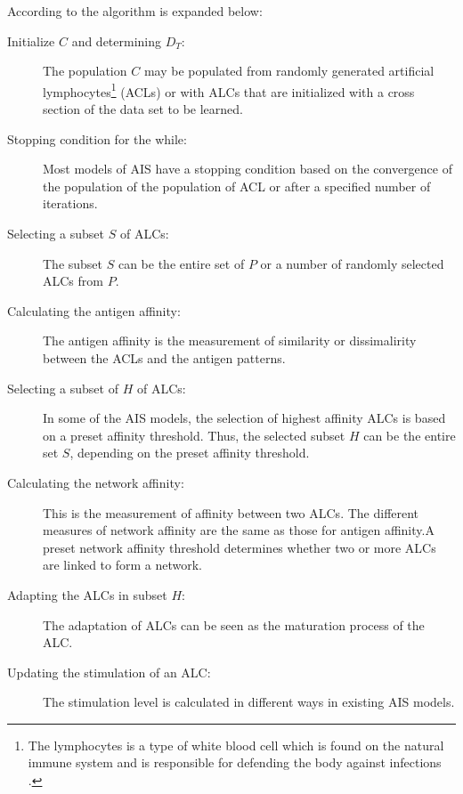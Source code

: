 \documentclass{assignment}
\begin{document}
According to \textcite{engelbrecht} the algorithm is expanded below:
\begin{description}
\item[Initialize $C$ and determining $D_T$:] The population $C$ may be populated from randomly generated artificial lymphocytes\footnote{The lymphocytes is a type of white blood cell which is found on the natural immune system and is responsible for defending the body against infections \cite{wiki:lymphocytes}.} (ACLs) or with ALCs that are initialized with a cross section of the data set to be learned.

\item[Stopping condition for the while:] Most models of AIS have a stopping condition based on the convergence of the population of the population of ACL or after a specified number of iterations.

\item[Selecting a subset $S$ of ALCs:] The subset $S$ can be the entire set of $P$ or a number of randomly selected ALCs from $P$. 

\item[Calculating the antigen affinity:] The antigen affinity is the measurement of similarity or dissimalirity between the ACLs and the antigen patterns.

\item[Selecting a subset of $H$ of ALCs:] In some of the AIS models, the selection of highest affinity ALCs is based on a preset affinity threshold. Thus, the selected subset $H$ can be the entire set $S$, depending on the preset affinity threshold.

\item[Calculating the network affinity:] This is the measurement of affinity between two ALCs. The different measures of network affinity are the same as those for antigen affinity.A preset network affinity threshold determines whether two or more ALCs are linked to form a network.

\item[Adapting the ALCs in subset $H$:] The adaptation of ALCs can be seen as the maturation process of the ALC.

\item[Updating the stimulation of an ALC:] The stimulation level is calculated in different ways in existing AIS models.

\end{description}
\end{document}
